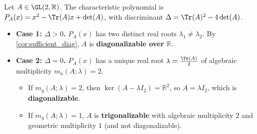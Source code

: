 \begin{exercisesolution}
\label{sol:real_2x2_similarity_classification}
Let $A \in \GL(2, \mathbb{R})$. The characteristic polynomial is $P_A(x) = x^2 - \Tr(A)x + \det(A)$, with discriminant $\Delta = \Tr(A)^2 - 4\det(A)$.
\begin{itemize}
    \item \textbf{Case 1: $\Delta > 0$.}
    $P_A(x)$ has two distinct real roots $\lambda_1 \ne \lambda_2$. By \cref{cor:sufficient_diag}, $A$ is \textbf{diagonalizable over $\mathbb{R}$}.

    \item \textbf{Case 2: $\Delta = 0$.}
    $P_A(x)$ has a unique real root $\lambda = \frac{\Tr(A)}{2}$ of algebraic multiplicity $m_a(A; \lambda) = 2$.
    \begin{itemize}
        \item If $m_g(A; \lambda) = 2$, then $\ker(A - \lambda I_2) = \mathbb{R}^2$, so $A = \lambda I_2$, which is \textbf{diagonalizable}.
        \item If $m_g(A; \lambda) = 1$, $A$ is \textbf{trigonalizable} with algebraic multiplicity $2$ and geometric multiplicity $1$ (and not diagonalizable).
    \end{itemize}


\end{itemize}
\end{exercisesolution}
